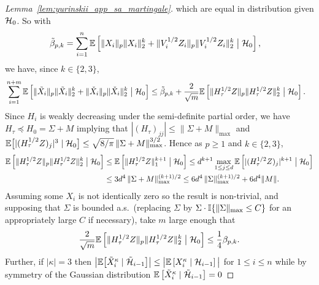 \begin{proof}[Lemma~\ref{lem:yurinskii_app_sa_martingale}]
  which are equal in distribution given $\mathcal{H}_0$.
  So with
  \begin{align*}
    \tilde \beta_{p,k}
    &=
    \sum_{i=1}^{n}
    \mathbb{E} \left[
      \|X_i\|_p \|X_i\|_2^k
      + \|V_i^{1/2} Z_i\|_p \|V_i^{1/2} Z_i\|_2^k
      \bigm| \mathcal{H}_0
    \right],
  \end{align*}
  we have, since $k \in \{2,3\}$,
  \begin{align*}
    &\sum_{i=1}^{n+m}
    \mathbb{E} \left[
      \|\tilde X_i\|_p \|\tilde X_i\|_2^k
      + \|\check X_i\|_p \|\check X_i\|_2^k
      \bigm| \mathcal{H}_0
    \right]
    \leq
    \tilde\beta_{p,k}
    + \frac{2}{\sqrt m}
    \mathbb{E} \left[
      \|H_\tau^{1/2} Z\|_p \|H_\tau^{1/2} Z\|_2^k
      \bigm| \mathcal{H}_0
    \right].
  \end{align*}
  Since $H_i$ is weakly decreasing under the
  semi-definite partial order, we have
  $H_\tau \preceq H_0 = \Sigma + M$
  implying that $|(H_\tau)_{j j}| \leq \|\Sigma + M\|_{\max}$ and
  $\mathbb{E}\big[|(H_\tau^{1/2} Z)_j|^3 \mid \mathcal{H}_0 \big]
  \leq \sqrt{8/\pi}\, \|\Sigma + M\|_{\max}^{3/2}$.
  Hence as $p \geq 1$ and $k \in \{2,3\}$,
  \begin{align*}
    \mathbb{E}\left[
      \|H_\tau^{1/2}Z\|_p
      \|H_\tau^{1/2}Z\|_2^k
      \bigm| \mathcal{H}_0
    \right]
    &\leq
    \mathbb{E}\left[\|H_\tau^{1/2} Z\|_1^{k+1}
      \bigm| \mathcal{H}_0
    \right]
    \leq
    d^{k+1} \max_{1\leq j\leq d}
    \mathbb{E}\left[|(H_\tau^{1/2} Z)_j|^{k+1}
      \bigm| \mathcal{H}_0
    \right] \\
    &\leq 3 d^4 \,
    \|\Sigma + M\|_{\max}^{(k+1)/2}
    \leq 6 d^4 \,
    \|\Sigma \|_{\max}^{(k+1)/2}
    + 6 d^4 \|M\|.
  \end{align*}
  Assuming some $X_i$ is not identically zero so
  the result is non-trivial,
  and supposing that $\Sigma$ is bounded a.s.\
  (replacing $\Sigma$ by $\Sigma \cdot \mathbb{I}\{\|\Sigma\|_{\max} \leq C\}$
  for an appropriately large $C$ if necessary),
  take $m$ large enough that
  \begin{align}
    \label{eq:yurinskii_app_bound_extra_terms}
    \frac{2}{\sqrt m}
    \mathbb{E} \left[
      \|H_\tau^{1/2} Z\|_p \|H_\tau^{1/2} Z\|_2^k
      \bigm| \mathcal{H}_0
    \right]
    \leq
    \frac{1}{4}
    \beta_{p,k}.
  \end{align}
  Further, if $|\kappa| = 3$ then
  $\big|\mathbb{E} \big[
  \tilde X_i^\kappa \mid \tilde {\mathcal{H}}_{i-1} \big]\big|
  \leq \big| \mathbb{E} \left[ X_i^\kappa \mid \mathcal{H}_{i-1} \right]\big|$
  for $1 \leq i \leq n$
  while by symmetry of the Gaussian distribution
  $\mathbb{E} \left[ \tilde X_i^\kappa \mid \tilde {\mathcal{H}}_{i-1} \right] = 0$

\end{proof}
